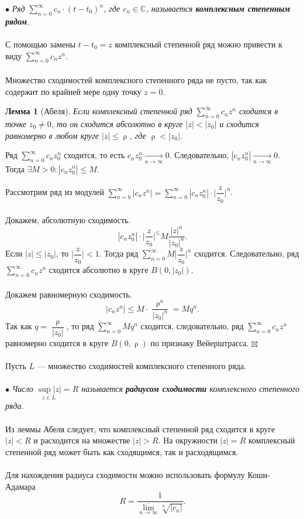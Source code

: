 \documentclass[a4paper, 12pt]{article}
\newenvironment{Proof} %
{\par\noindent{$\blacklozenge$}} %
{\hfill$\scriptstyle\boxtimes$}
\newcommand{\Cm}{\mathbb{C}}
\renewcommand{\leq}{\leqslant}
\renewcommand{\rho}{\uprho}
\newcommand{\sumz}{\sum\limits_{n = 0}^\infty }
\newtheorem*{lem}{Лемма}
\begin{document}
$\bullet$ \textit{Ряд $\sumz c_n\cdot (t-t_0)^n$, где $c_n \in \Cm$, называется \textbf{комплексным степенным рядом}.}\\\\
С помощью замены $t-t_0 = z$ комплексный степенной ряд можно привести к виду $\sumz c_nz^n.$ \\\\
Множество сходимостей комплексного степенного ряда не пусто, так как содержит по крайней мере одну точку $z = 0$.
\begin{lem}
	[Абеля]
	Если комплексный степенной ряд $\sumz c_nz^n$ сходится в точке $z_0 \ne 0$, то он сходится абсолютно в круге $|z| < |z_0|$ и сходится равномерно в любом круге $|z|\leq \rho$, где $\rho < |z_0|$.
\end{lem}\begin{Proof}
Ряд $\sumz c_nz_0^n$ сходится, то есть $c_nz_0^n \underset{n\to \infty}{\longrightarrow} 0$. Следовательно, $|c_nz_0^n| \underset{n\to \infty}{\longrightarrow} 0$. Тогда $\exists M> 0 : |c_nz_0^n| \leq M$.\\\\
Рассмотрим ряд из модулей $\sumz |c_nz^n| = \sumz |c_nz_0^n|\cdot \Big|\dfrac{z}{z_0}\Big|^n$.\\\\
Докажем, абсолютную сходимость. $$|c_nz_0^n|\cdot \Big|\dfrac{z}{z_0}\Big|^ \leq M\dfrac{|z|^n}{|z_0|^n}.$$
Если $|z|\leq |z_0|$, то $\Big|\dfrac{z}{z_0}\Big|<1$. Тогда ряд $\sumz M\Big|\dfrac{z}{z_0}\Big|^n$ сходится. Следовательно, ряд $\sumz c_nz^n$ сходится абсолютно в круге $B(0, |z_0|)$.\\\\
Докажем равномерную сходимость. $$|c_nz^n| \leq M\cdot \dfrac{\rho ^n}{|z_0|^n} = Mq^n.$$
Так как $q = \dfrac{\rho}{|z_0|}$, то ряд $\sumz Mq^n$ сходится, следовательно, ряд $\sumz c_nz^n$ равномерно сходится в круге $B(0,\rho)$ по признаку Вейерштрасса.
\end{Proof}\\\\
Пусть $L$ --- множество сходимостей комплексного степенного ряда.\\\\
$\bullet$ \textit{Число $\underset{z \in L}{\sup |z|} = R$ называется \textbf{радиусом сходимости} комплексного степенного ряда.}\\\\
Из леммы Абеля следует, что комплексный степенной ряд сходится в круге $|z|<R$ и расходится на множестве $|z| > R$. На окружности $|z| = R$ комплексный степенной ряд может быть как сходящимся, так и расходящимся.\\\\
Для нахождения радиуса сходимости можно использовать формулу Коши-Адамара $$R = \dfrac{1}{\overline{\lim\limits_{n \to \infty}} \sqrt[n]{|c_n|}}.$$
\end{document}
